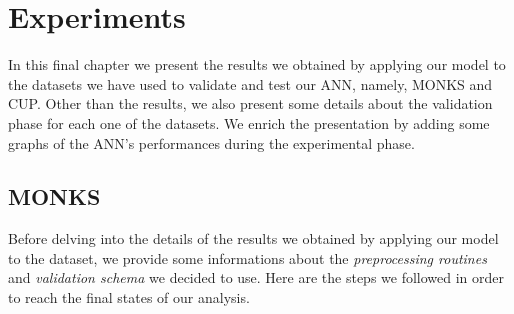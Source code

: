 \chapter{Experiments} %
\label{cha:experiments}
    In this final chapter we present the results we obtained by applying our model to the datasets we have used
    to validate and test our ANN, namely, MONKS and CUP. Other than the results, we also present some details
    about the validation phase for each one of the datasets. We enrich the presentation by adding some graphs
    of the ANN's performances during the experimental phase.

    \section{MONKS} %
    \label{sec:monks}
        Before delving into the details of the results we obtained by applying our model to the dataset, we
        provide some informations about the \textit{preprocessing routines} and \textit{validation schema} we
        decided to use. Here are the steps we followed in order to reach the final states of our analysis.

